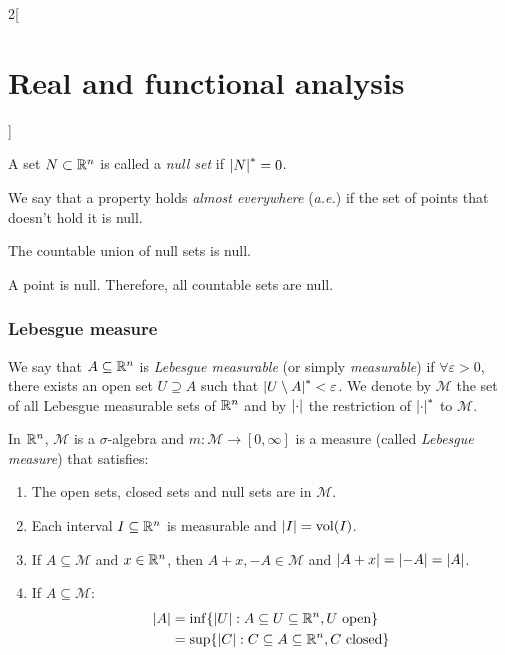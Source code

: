 \documentclass[../../../main_math.tex]{subfiles}
\begin{document}
\begin{multicols}{2}[\section{Real and functional analysis}]
\begin{definition}
    A set $N\subset\mathbb{R}^n$ is called a \emph{null set} if $\om{N}=0$.
  \end{definition}
  \begin{definition}
    We say that a property holds \emph{almost everywhere} (\emph{a.e.}) if the set of points that doesn't hold it is null.
  \end{definition}
  \begin{lemma}
    The countable union of null sets is null.
  \end{lemma}
  \begin{lemma}
    A point is null. Therefore, all countable sets are null.
  \end{lemma}
  \subsubsection{Lebesgue measure}
  \begin{definition}
    We say that $A\subseteq\mathbb{R}^n$ is \emph{Lebesgue measurable} (or simply \emph{measurable}) if $\forall \varepsilon>0$, there exists an open set $U\supseteq A$ such that $\om{U\setminus A}<\varepsilon$. We denote by $\mathcal{M}$ the set of all Lebesgue measurable sets of $\mathbb{R}^n$ and by $\m{}$ the restriction of $\om{}$ to ${\mathcal{M}}$.
  \end{definition}
  \begin{theorem}
    In $\mathbb{R}^n$, $\mathcal{M}$ is a $\sigma$-algebra and $m:\mathcal{M}\rightarrow[0,\infty]$ is a measure (called \emph{Lebesgue measure}) that satisfies:
    \begin{enumerate}
      \item The open sets, closed sets and null sets are in $\mathcal{M}$.
      \item Each interval $I\subseteq \mathbb{R}^n$ is measurable and $\m{I}=\vol(I)$.
      \item If $A\subseteq\mathcal{M}$ and $x\in\mathbb{R}^n$, then $A+x,-A\in\mathcal{M}$ and $\m{A+x}=\m{-A}=\m{A}$.
      \item If $A\subseteq\mathcal{M}$:
            \begin{align*}
              \m{A} & =\inf\{\m{U}:A\subseteq U \subseteq\RR^n, U\text{ open}\}  \\
                    & =\sup\{\m{C}:C\subseteq A\subseteq\RR^n, C\text{ closed}\}
            \end{align*}
    \end{enumerate}
  \end{theorem}
  \begin{definition}

\end{definition}
\end{multicols}
\end{document}
